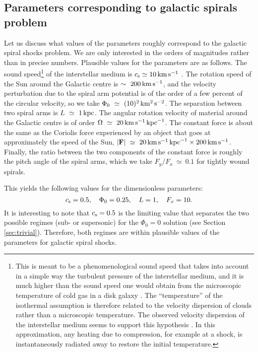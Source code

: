 \documentclass[useAMS,usenatbib]{mn2e}
\begin{document}
\subsection{Parameters corresponding to galactic spirals problem} \label{sec:parametersb}
%
Let us discuss what values of the parameters roughly correspond to the galactic spiral shocks problem. We are only interested in the orders of magnitudes rather than in precise numbers. Plausible values for the parameters are as follows. The sound speed\footnote{This is meant to be a phenomenological sound speed that takes into account in a simple way the turbulent pressure of the interstellar medium, and it is much higher than the sound speed one would obtain from the microscopic temperature of cold gas in a disk galaxy \citep[e.g.][]{Roberts1969,Cowie1980}. The ``temperature'' of the isothermal assumption is therefore related to the velocity dispersion of clouds rather than a microscopic temperature. The observed velocity dispersion of the interstellar medium seems to support this hypothesis \citep[e.g.][]{DickeyLockman1990}. In this approximation, any heating due to compression, for example at a shock, is instantaneously radiated away to restore the initial temperature.} of the interstellar medium is $c_{\rm s}\simeq10\,{\rm km\, s^{-1}}$ \citep[e.g.][]{Roberts1969}. The rotation speed of the Sun around the Galactic centre is $\sim~200\,{\rm km\, s^{-1}}$, and the velocity perturbation due to the spiral arm potential is of the order of a few percent of the circular velocity, so we take $\Phi_0~\simeq~(10)^2 \,{\rm km^2\, s^{-2}}$. The separation between two spiral arms is $L~\simeq~1 \,{\rm kpc}$. The angular rotation velocity of material around the Galactic centre is of order $\Omega~\simeq~20\,{\rm km\, s^{-1}}\,{\rm kpc}^{-1}$. The constant force is about the same as the Coriolis force experienced by an object that goes at approximately the speed of the Sun,  $|\mathbf{F}|~\simeq~20\,{\rm km\, s^{-1}}\,{\rm kpc}^{-1}\times 200\,{\rm km\, s^{-1}}$. Finally, the ratio between the two components of the constant force is roughly the pitch angle of the spiral arms, which we take $F_y/F_x~\simeq~0.1$ for tightly wound spirals.

This yields the following values for the dimensionless parameters:
\begin{equation}
c_{\rm s} = 0.5, \quad \Phi_0 = 0.25, \quad L = 1, \quad F_x = 10.
\end{equation}
It is interesting to note that $c_{\rm s}=0.5$ is the limiting value that separates the two possible regimes (sub- or supersonic) for the $\Phi_0=0$ solution (see Section \ref{sec:trivial}). Therefore, both regimes are within plausible values of the parameters for galactic spiral shocks.
\end{document}
